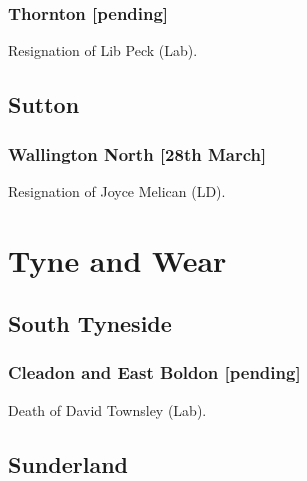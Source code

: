 \documentclass[a4paper,openany]{book}
\begin{document}
\begin{resultsiii}
\subsubsection*{Thornton
	\hspace*{\fill}\nolinebreak[1]%
	\enspace\hspace*{\fill}
	[pending]}


Resignation of Lib Peck (Lab).

\subsection*{Sutton}

\subsubsection*{Wallington North \hspace*{\fill}\nolinebreak[1]%
	\enspace\hspace*{\fill}
	[28th March]}


Resignation of Joyce Melican (LD).

\section{Tyne and Wear}

\subsection*{South Tyneside}

\subsubsection*{Cleadon and East Boldon \hspace*{\fill}\nolinebreak[1]%
	\enspace\hspace*{\fill}
	[pending]}


Death of David Townsley (Lab).

\subsection*{Sunderland}


\end{resultsiii}
\end{document}
